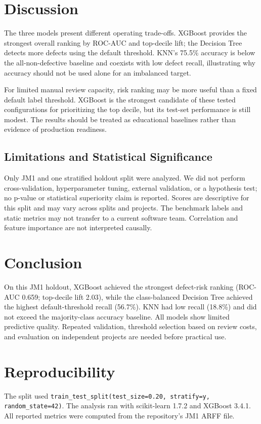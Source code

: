 \documentclass[conference]{IEEEtran}
\begin{document}
\section{Discussion}
The three models present different operating trade-offs. XGBoost provides the strongest overall ranking by ROC-AUC and top-decile lift; the Decision Tree detects more defects using the default threshold. KNN's 75.5\% accuracy is below the all-non-defective baseline and coexists with low defect recall, illustrating why accuracy should not be used alone for an imbalanced target.

For limited manual review capacity, risk ranking may be more useful than a fixed default label threshold. XGBoost is the strongest candidate of these tested configurations for prioritizing the top decile, but its test-set performance is still modest. The results should be treated as educational baselines rather than evidence of production readiness.

\subsection{Limitations and Statistical Significance}
Only JM1 and one stratified holdout split were analyzed. We did not perform cross-validation, hyperparameter tuning, external validation, or a hypothesis test; no p-value or statistical superiority claim is reported. Scores are descriptive for this split and may vary across splits and projects. The benchmark labels and static metrics may not transfer to a current software team. Correlation and feature importance are not interpreted causally.

\section{Conclusion}
On this JM1 holdout, XGBoost achieved the strongest defect-risk ranking (ROC-AUC 0.659; top-decile lift 2.03), while the class-balanced Decision Tree achieved the highest default-threshold recall (56.7\%). KNN had low recall (18.8\%) and did not exceed the majority-class accuracy baseline. All models show limited predictive quality. Repeated validation, threshold selection based on review costs, and evaluation on independent projects are needed before practical use.

\section*{Reproducibility}
The split used \texttt{train\_test\_split(test\_size=0.20, stratify=y, random\_state=42)}. The analysis ran with scikit-learn 1.7.2 and XGBoost 3.4.1. All reported metrics were computed from the repository's JM1 ARFF file.



\end{document}

